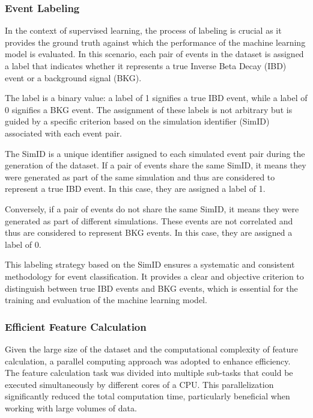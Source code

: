 \subsubsection*{Event Labeling}

In the context of supervised learning, the process of labeling is crucial as it provides the ground truth against which the performance of the machine learning model is evaluated. In this scenario, each pair of events in the dataset is assigned a label that indicates whether it represents a true Inverse Beta Decay (IBD) event or a background signal (BKG).

The label is a binary value: a label of 1 signifies a true IBD event, while a label of 0 signifies a BKG event. The assignment of these labels is not arbitrary but is guided by a specific criterion based on the simulation identifier (SimID) associated with each event pair.

The SimID is a unique identifier assigned to each simulated event pair during the generation of the dataset. If a pair of events share the same SimID, it means they were generated as part of the same simulation and thus are considered to represent a true IBD event. In this case, they are assigned a label of 1.

Conversely, if a pair of events do not share the same SimID, it means they were generated as part of different simulations. These events are not correlated and thus are considered to represent BKG events. In this case, they are assigned a label of 0.

This labeling strategy based on the SimID ensures a systematic and consistent methodology for event classification. It provides a clear and objective criterion to distinguish between true IBD events and BKG events, which is essential for the training and evaluation of the machine learning model.


\subsubsection*{Efficient Feature Calculation}
Given the large size of the dataset and the computational complexity of feature calculation, a parallel computing approach was adopted to enhance efficiency. The feature calculation task was divided into multiple sub-tasks that could be executed simultaneously by different cores of a CPU. This parallelization significantly reduced the total computation time, particularly beneficial when working with large volumes of data.

